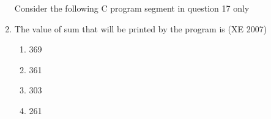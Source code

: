 \documentclass[journal,12pt,onecolumn]{IEEEtran}
\theoremstyle{remark}
\begin{document}
\begin{enumerate}
Consider the following C program segment in question 17 only\\

\item The value of sum that will be printed by the program is
\hfill{(XE 2007)}
\begin{multicols}{4}
\begin{enumerate}
\item 369
\item 361
\item 303
\item 261
\end{enumerate} 
\end{multicols}

\end{enumerate}
\end{document}
